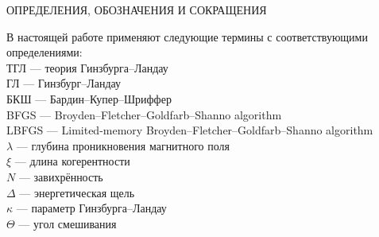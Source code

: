 \begin{center}
	ОПРЕДЕЛЕНИЯ, ОБОЗНАЧЕНИЯ И СОКРАЩЕНИЯ
\end{center}

В настоящей работе применяют следующие термины с соответствующими 
определениями: \\
ТГЛ --- теория Гинзбурга--Ландау \\
ГЛ --- Гинзбург--Ландау \\
БКШ --- Бардин--Купер--Шриффер \\
BFGS --- Broyden--Fletcher--Goldfarb--Shanno algorithm \\
LBFGS --- Limited-memory Broyden--Fletcher--Goldfarb--Shanno algorithm \\
\( \lambda \) --- глубина проникновения магнитного поля \\
\( \xi \) --- длина когерентности \\
\( N \) --- завихрённость \\
\( \Delta \) --- энергетическая щель \\
\( \kappa \) --- параметр Гинзбурга--Ландау \\
\( \Theta \) --- угол смешивания \\

\newpage